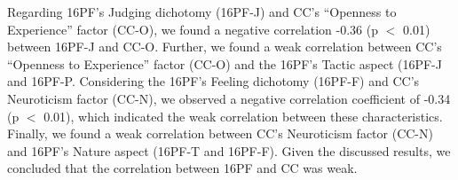 \begin{table}[!ht]
\centering
\caption{Correlation between 16PF Dichotomies and context cards factors.}
\label{tabela45}
\end{table}

Regarding 16PF's Judging dichotomy (16PF-J) and CC's ``Openness to Experience'' factor (CC-O), we found a negative correlation -0.36 (p $<$  0.01) between 16PF-J and CC-O.  Further, we found a weak correlation between CC's ``Openness to Experience'' factor (CC-O) and the 16PF's Tactic aspect (16PF-J and 16PF-P. Considering the 16PF's Feeling dichotomy (16PF-F) and CC's Neuroticism factor (CC-N), we observed a negative correlation coefficient of -0.34 (p $<$ 0.01), which indicated the weak correlation between these characteristics. Finally, we found a weak correlation between CC's Neuroticism factor (CC-N) and 16PF's Nature aspect (16PF-T and 16PF-F). Given the discussed results, we concluded that the correlation between 16PF and CC was weak.


